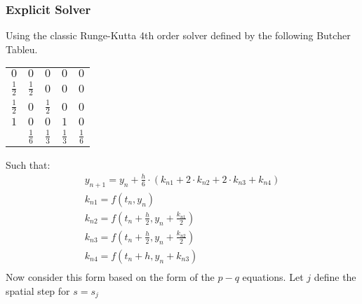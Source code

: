 \documentclass{article}
\begin{document}
\subsubsection{Explicit Solver}
Using the classic Runge-Kutta 4th order solver defined by the following Butcher Tableu.
\begin{center}
	\begin{tabular}{c|c c c c}
		$0$           & $0$           & $0$           & $0$           & $0$           \\
		$\frac{1}{2}$ & $\frac{1}{2}$ & $0$           & $0$           & $0$           \\
		$\frac{1}{2}$ & $0$           & $\frac{1}{2}$ & $0$           & $0$           \\
		$1$           & $0$           & $0$           & $1$           & $0$           \\
		\hline
		              & $\frac{1}{6}$ & $\frac{1}{3}$ & $\frac{1}{3}$ & $\frac{1}{6}$
	\end{tabular}
\end{center}
Such that:
\begin{align*}
	y_{n+1} = y_n + \frac{h}{6}\cdot\left(k_{n1} + 2\cdot k_{n2} + 2\cdot k_{n3} + k_{n4} \right) \\
	k_{n1} = f(t_n, y_n)                                                                          \\
	k_{n2} = f\left(t_n + \frac{h}{2}, y_n + \frac{k_{n1}}{2}\right)                              \\
	k_{n3} = f\left(t_n +\frac{h}{2}, y_n+\frac{k_{n2}}{2} \right)                                \\
	k_{n4} = f\left(t_n + h, y_n + k_{n3} \right)                                                 \\
\end{align*}
Now consider this form based on the form of the $p-q$ equations. Let $j$ define the spatial step for $s=s_j$
\end{document}
